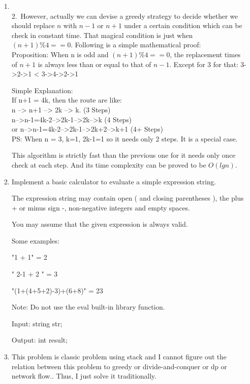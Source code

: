 \documentclass[12pt,a4paper]{article}
\makeatletter
\newtheorem*{solution}{Solution}
\renewenvironment{solution}[1][Solution] {\par\pushQED{\qed}\normalfont\topsep6\p@\@plus6\p@\relax\trivlist\item[\hskip\labelsep\bfseries#1\@addpunct{.}]\ignorespaces}{\popQED\endtrivlist\@endpefalse} \makeatother
\makeatother
\begin{document}
\begin{enumerate}
\begin{solution}
~\\
2.~However, actually we can devise a greedy strategy to decide whether we should replace $n$ with $n-1$ or $n+1$ under a certain condition which can be check in constant time. That magical condition is just when $(n+1)\%4==0$. Following is a simple mathematical proof:~\\

Proposition: When n is odd and $(n+1)\%4==0$, the replacement times of $n+1$ is always less than or equal to that of $n-1$.
Except for 3 for that: 3->2->1 < 3->4->2->1 


Simple Explanation:
~\\
	If n+1 = 4k, then the route are like:~\\
	n --> n+1 --> 2k --> k. (3 Steps)~\\
	n-->n-1=4k-2-->2k-1-->2k-->k (4 Steps)~\\
	or n-->n-1=4k-2-->2k-1-->2k+2-->k+1 (4+ Steps)~\\
	PS: When n = 3, k=1, 2k-1=1 so it needs only 2 steps. It is a special case.

This algorithm is strictly fast than the previous one for it needs only once check at each step. And its time complexity can be proved to be $O(lgn)$.

\end{solution}

	
\item 
Implement a basic calculator to evaluate a simple expression string.

The expression string may contain open ( and closing parentheses ), the plus + or minus sign -, non-negative integers and empty spaces.

You may assume that the given expression is always valid.

Some examples:

"1 + 1" = 2

" 2-1 + 2 " = 3

"(1+(4+5+2)-3)+(6+8)" = 23

Note: Do not use the eval built-in library function.

Input: string str;

Output: int result;


\begin{solution}

This problem is classic problem using stack and I cannot figure out the relation between this problem to greedy or divide-and-conquer or dp or network flow.. Thus, I just solve it traditionally.


\end{solution}
\end{enumerate}
\end{document}

